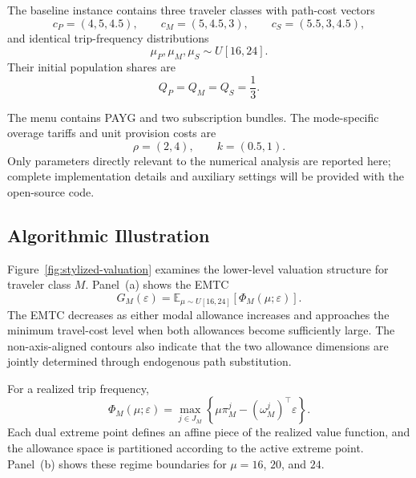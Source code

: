\documentclass{article}
\begin{document}
The baseline instance contains three traveler classes with path-cost vectors
\begin{equation}
    c_P=(4,5,4.5),\qquad
    c_M=(5,4.5,3),\qquad
    c_S=(5.5,3,4.5),
\end{equation}
and identical trip-frequency distributions
\begin{equation}
    \mu_P,\mu_M,\mu_S\sim U[16,24].
\end{equation}
Their initial population shares are
\begin{equation}
    Q_P=Q_M=Q_S=\frac13.
\end{equation}

The menu contains PAYG and two subscription bundles. The mode-specific overage tariffs and unit provision costs are
\begin{equation}
    \rho=(2,4),
    \qquad
    k=(0.5,1).
\end{equation}
Only parameters directly relevant to the numerical analysis are reported here; complete implementation details and auxiliary settings will be provided with the open-source code.

\subsection{Algorithmic Illustration}

Figure~\ref{fig:stylized-valuation} examines the lower-level valuation structure for traveler class $M$. Panel~(a) shows the EMTC
\begin{equation}
    G_M(\varepsilon)
    =
    \mathbb{E}_{\mu\sim U[16,24]}
    \left[\Phi_M(\mu;\varepsilon)\right].
\end{equation}
The EMTC decreases as either modal allowance increases and approaches the minimum travel-cost level when both allowances become sufficiently large. The non-axis-aligned contours also indicate that the two allowance dimensions are jointly determined through endogenous path substitution.

For a realized trip frequency,
\begin{equation}
    \Phi_M(\mu;\varepsilon)
    =
    \max_{j\in J_M}
    \left\{
        \mu\pi_M^j-(\omega_M^j)^\top\varepsilon
    \right\}.
\end{equation}
Each dual extreme point defines an affine piece of the realized value function, and the allowance space is partitioned according to the active extreme point. Panel~(b) shows these regime boundaries for $\mu=16$, $20$, and $24$.
\end{document}
